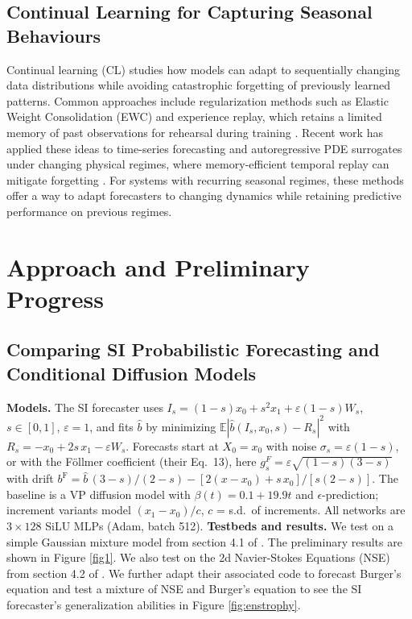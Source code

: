 \documentclass{article}
\begin{document}
\subsection{Continual Learning for Capturing Seasonal Behaviours}
Continual learning (CL) studies how models can adapt to sequentially changing data distributions while avoiding catastrophic forgetting of previously learned patterns. Common approaches include regularization methods such as Elastic Weight Consolidation (EWC) \cite{kirkpatrick2017overcoming} and experience replay, which retains a limited memory of past observations for rehearsal during training \cite{rolnick2019experience}. Recent work has applied these ideas to time-series forecasting \cite{besnard2024continual} and autoregressive PDE surrogates under changing physical regimes, where memory-efficient temporal replay can mitigate forgetting \cite{hemati2026continual}. For systems with recurring seasonal regimes, these methods offer a way to adapt forecasters to changing dynamics while retaining predictive performance on previous regimes.




\section{Approach and Preliminary Progress}
\subsection{Comparing SI Probabilistic Forecasting and Conditional Diffusion Models}
\textbf{Models.} The SI forecaster uses $I_s=(1-s)x_0+s^2x_1+\varepsilon(1-s)W_s$, $s\in[0,1]$, $\varepsilon=1$, and fits $\hat b$ by minimizing $\mathbb E|\hat b(I_s,x_0,s)-R_s|^2$ with $R_s=-x_0+2s\,x_1-\varepsilon W_s$. Forecasts start at $X_0=x_0$ with noise $\sigma_s=\varepsilon(1-s)$, or with the F\"ollmer coefficient (their Eq.~13), here $g^F_s=\varepsilon\sqrt{(1-s)(3-s)}$ with drift $b^{\mathrm F}=\hat b\,(3-s)/(2-s)-[2(x-x_0)+s\,x_0]/[s(2-s)]$. The baseline is a VP diffusion model \citep{song2021sde} with $\beta(t)=0.1+19.9t$ and $\epsilon$-prediction; increment variants model $(x_1-x_0)/c$, $c$ = s.d.\ of increments. All networks are $3{\times}128$ SiLU MLPs (Adam, batch 512).
\textbf{Testbeds and results.} We test on a simple Gaussian mixture model from section 4.1 of \cite{chen2024forecasting}. The preliminary results are shown in Figure \ref{fig1}.
We also test on the 2d Navier-Stokes Equations (NSE) from section 4.2 of \cite{chen2024forecasting}. We further adapt their associated code to forecast Burger's equation and test a mixture of NSE and Burger's equation to see the SI forecaster's generalization abilities in Figure \ref{fig:enstrophy}.
\end{document}
